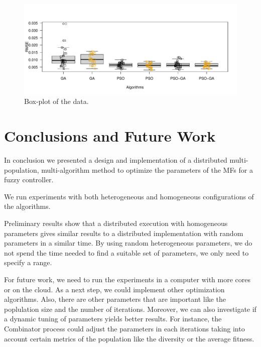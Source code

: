 \documentclass[runningheads]{llncs}
\begin{document}
\begin{figure}[ht]
  \centering
  \includegraphics[angle=0,width=1\textwidth]{boxplot}
  \caption{Box-plot of the data.}
  \label{fig:boxplot} 
\end{figure}

\section{Conclusions and Future Work}\label{sec:conclusions}

In conclusion we presented a design and implementation of a distributed 
multi-population, multi-algorithm method to optimize the parameters of 
the MFs for a fuzzy controller.

We run experiments with both heterogeneous and homogeneous configurations
of the algorithms.

Preliminary results show that a distributed execution with homogeneous 
parameters gives similar results to a distributed implementation with 
random parameters in a similar time.  By using random heterogeneous 
parameters, we do not spend the time needed to find a suitable set of
parameters, we only need to specify a range.

For future work, we need to run the experiments in a computer with 
more cores or on the cloud. As a next step,  we could implement 
other optimization algorithms. Also, there are other parameters that 
are important like the poplulation size and the number of iterations.
Moreover, we can also investigate if a dynamic tuning of parameters yields 
better results. For instance, the Combinator process could adjust the parameters 
in each iterations taking into account certain metrics of the population like 
the diversity or the average fitness.

%
%
%


%

\end{document}
